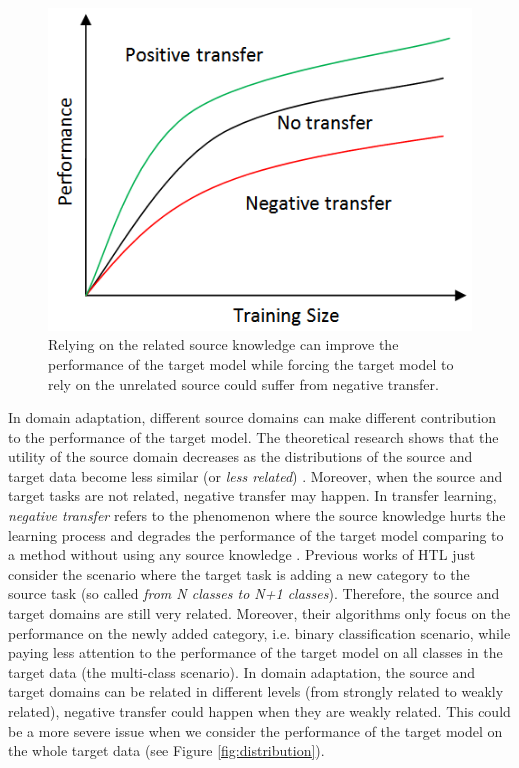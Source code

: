 \begin{figure}[h]
	\centering
	\includegraphics[scale=.4]{fig/negative.png}
	\caption{Relying on the related source knowledge can improve the performance of the target model while forcing the target model to rely on the unrelated source could suffer from negative transfer.}
\end{figure}

In domain adaptation, different source domains can make different contribution to the performance of the target model.
The theoretical research \cite{ben2010theory} \cite{ben2007analysis} shows that the utility of the source domain decreases as the distributions of the source and target data become less similar (or \textit{less related}) . Moreover, when the source and target tasks are not related, negative transfer may happen. In transfer learning, \textit{negative transfer} 
refers to the phenomenon where the source knowledge hurts the learning process and degrades the performance of the target model comparing to a method without using any source knowledge \cite{pan2010survey}. 
Previous works of HTL \cite{tommasi2014learning} \cite{kuzborskij2013n} \cite{jie2011multiclass} just consider the scenario where the target task is adding a new category to the source task (so called \textit{from N classes to N+1 classes}). Therefore, the source and target domains are still very related. Moreover, their algorithms only focus on the performance on the newly added category, i.e. binary classification scenario, while paying less attention to the performance of the target model on all classes in the target data (the multi-class scenario). In domain adaptation, the source and target domains can be related in different levels (from strongly related to weakly related), negative transfer could happen when they are weakly related. This could be a more severe issue when we consider the performance of the target model on the whole target data (see Figure \ref{fig:distribution}).

